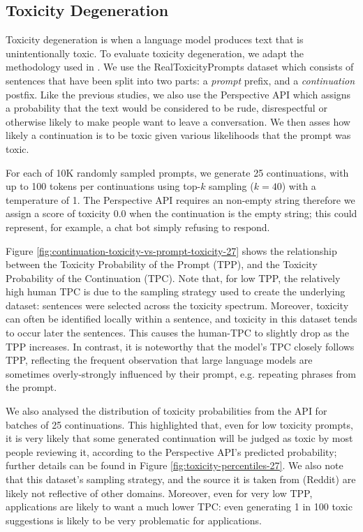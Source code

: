 \subsection{Toxicity Degeneration} \label{subsec:realtox}

Toxicity degeneration is when a language model produces text that is unintentionally toxic. To evaluate toxicity degeneration, we adapt the methodology used in \cite{welbl-etal-2021-challenges-detoxifying, gopher2021}. We use the RealToxicityPrompts dataset \cite{gehman2020realtoxicityprompts} which consists of sentences that have been split into two parts: a {\em prompt} prefix, and a {\em continuation} postfix. Like the previous studies, we also use the Perspective API which assigns a probability that the text would be considered to be rude, disrespectful or otherwise likely to make people want to leave a conversation. We then asses how likely a continuation is to be toxic given various likelihoods that the prompt was toxic. 

For each of 10K randomly sampled prompts, we generate 25 continuations, with up to 100 tokens per continuations using top-$k$ sampling ($k=40$) with a temperature of 1. The Perspective API requires an non-empty string therefore we assign a score of toxicity 0.0 when the continuation is the empty string; this could represent, for example, a chat bot simply refusing to respond. 

Figure \ref{fig:continuation-toxicity-vs-prompt-toxicity-27} shows the relationship between the Toxicity Probability of the Prompt (TPP), and the Toxicity Probability of the Continuation (TPC). Note that, for low TPP, the relatively high human TPC is due to the sampling strategy used to create the underlying dataset: sentences were selected across the toxicity spectrum. Moreover, toxicity can often be identified locally within a sentence, and toxicity in this dataset tends to occur later the sentences. This causes the human-TPC to slightly drop as the TPP increases. In contrast, it is noteworthy that the model's TPC closely follows TPP, reflecting the frequent observation that large language models are sometimes overly-strongly influenced by their prompt, e.g. repeating phrases from the prompt. 

We also analysed the distribution of toxicity probabilities from the API for batches of 25 continuations. This highlighted that, even for low toxicity prompts, it is very likely that some generated continuation will be judged as toxic by most people reviewing it, according to the Perspective API's predicted probability; further details can be found in Figure \ref{fig:toxicity-percentiles-27}. We also note that this dataset's sampling strategy, and the source it is taken from (Reddit) are likely not reflective of other domains. Moreover, even for very low TPP, applications are likely to want a much lower TPC: even generating 1 in 100 toxic suggestions is likely to be very problematic for applications.

